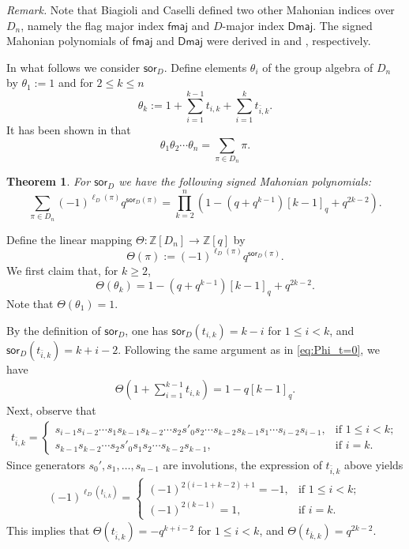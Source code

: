\documentclass[a4paper, reqno, 11pt]{amsart}
\newtheorem{thm}[lem]{Theorem}
\newcommand{\fmaj}{{\textsf{fmaj}}}
\newcommand{\Dmaj}{{\textsf{Dmaj}}}
\newcommand{\sor}{{\textsf{sor}}}
\numberwithin{equation}{section}
\def\proof{\noindent{\bf Proof.\quad}}
\begin{document}
\noindent \emph{Remark.}
Note that Biagioli and Caselli \cite{Biagioli_Caselli_04} defined two other Mahonian indices over $D_n$, namely the flag major index $\fmaj$ and $D$-major index $\Dmaj$. 
The signed Mahonian polynomials of $\fmaj$ and $\Dmaj$ were derived in \cite{Biagioli_Caselli_12} and \cite{Biagioli_06}, respectively.



In what follows we consider $\sor_D$.
Define elements $\theta_i$ of the group algebra of $D_n$ by $\theta_1:=1$ and for $2\leq k\leq n$ $$\theta_k:=1+\sum_{i=1}^{k-1}t_{i,k}+\sum_{i=1}^{k}t_{\bar{i},k}.$$
It has been shown in \cite{Petersen_11} that 
\begin{equation}\label{eq:D_algebra}
\theta_1\theta_2\cdots\theta_n = \sum_{\pi\in D_n}\pi.
\end{equation}

\begin{thm}\label{D_sor}
For $\sor_D$ we have the following signed Mahonian polynomials:
$$\sum_{\pi\in D_n}(-1)^{\ell_D(\pi)}q^{\sor_D(\pi)} = \prod_{k=2}^n \left( 1-(q+q^{k-1})[k-1]_q+q^{2k-2} \right).$$
\end{thm}
\proof
Define the linear mapping $\Theta:\mathbb{Z}[D_n]\to\mathbb{Z}[q]$ by $$\Theta(\pi):=(-1)^{\ell_D(\pi)}q^{\sor_D(\pi)}.$$
We first claim that, for $k\geq 2$,
\begin{equation}\label{eq:Theta}
\Theta(\theta_k) = 1-(q+q^{k-1})[k-1]_q+q^{2k-2}.
\end{equation}
Note that $\Theta(\theta_1)=1$.

By the definition of $\sor_D$, one has $\sor_D(t_{i,k})=k-i$ for $1\leq i<k$, and $\sor_D(t_{\bar{i},k})=k+i-2$.
Following the same argument as in \eqref{eq:Phi_t=0}, we have 
\begin{align*}
\Theta\left( 1+\sum_{i=1}^{k-1}t_{i,k} \right) = 1-q[k-1]_q.
\end{align*}
Next, observe that
\begin{align*}
t_{\bar{i},k} = \begin{cases}
s_{i-1}s_{i-2}\cdots s_1s_{k-1}s_{k-2}\cdots s_2 s'_0 s_2 \cdots s_{k-2} s_{k-1} s_1\cdots s_{i-2} s_{i-1}, & \text{if } 1\leq i<k; \\
s_{k-1}s_{k-2}\cdots s_2 s'_0 s_1 s_2 \cdots s_{k-2} s_{k-1}, & \text{if } i=k.
\end{cases}
\end{align*}
Since generators $s_0',s_1,\ldots,s_{n-1}$ are involutions, the expression of $t_{\bar{i},k}$ above yields
\begin{align*}
(-1)^{\ell_D(t_{\bar{i},k})} = \begin{cases}
(-1)^{2(i-1+k-2)+1}=-1, & \text{if } 1\leq i<k; \\
(-1)^{2(k-1)}=1, & \text{if } i=k.
\end{cases}
\end{align*}
This implies that $\Theta(t_{\bar{i},k})=-q^{k+i-2}$ for $1\leq i<k$, and $\Theta(t_{\bar{k},k})=q^{2k-2}$.
\end{document}
